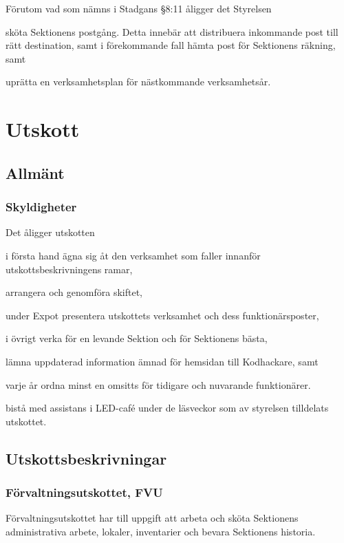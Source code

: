 \documentclass[10pt]{article}
\renewcommand{\thesubsection}{\arabic{section}:\Alph{subsection}}
\begin{document}
Förutom vad som nämns i Stadgans §8:11 åligger det Styrelsen
\begin{attlist}
    \item sköta Sektionens postgång. Detta innebär att distribuera inkommande
        post till rätt destination, samt i förekommande fall hämta post för
        Sektionens räkning, samt
    \item uprätta en verksamhetsplan för nästkommande verksamhetsår.
\end{attlist}

\renewcommand*\thesubsection{\arabic{section}:\arabic{subsection}}
\renewcommand*\thesubsubsection
{\arabic{section}:\arabic{subsection}:\Alph{subsubsection}}

\section{Utskott} %
\subsection{Allmänt}
\subsubsection{Skyldigheter}
Det åligger utskotten
\begin{attlist}
    \item i första hand ägna sig åt den verksamhet som faller innanför
        utskottsbeskrivningens ramar,
    \item arrangera och genomföra skiftet,
    \item under Expot presentera utskottets verksamhet och dess
        funktionärsposter,
    \item i övrigt verka för en levande Sektion och för Sektionens bästa,
    \item lämna uppdaterad information ämnad för hemsidan till Kodhackare, samt
    \item varje år ordna minst en omsitts för tidigare och nuvarande funktionärer.
    \item bistå med assistans i LED-café under de läsveckor som av styrelsen tilldelats utskottet.
\end{attlist}

\subsection{Utskottsbeskrivningar}
\subsubsection{Förvaltningsutskottet, FVU}
Förvaltningsutskottet har till uppgift att arbeta och sköta Sektionens administrativa arbete, lokaler, inventarier och bevara Sektionens historia.
\end{document}
